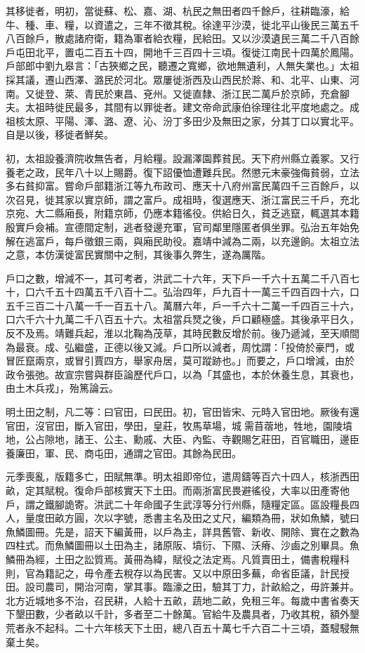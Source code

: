 其移徙者，明初，當徙蘇、松、嘉、湖、杭民之無田者四千餘戶，往耕臨濠，給牛、種、車、糧，以資遣之，三年不徵其稅。徐達平沙漠，徙北平山後民三萬五千八百餘戶，散處諸府衛，籍為軍者給衣糧，民給田。又以沙漠遺民三萬二千八百餘戶屯田北平，置屯二百五十四，開地千三百四十三頃。復徙江南民十四萬於鳳陽。戶部郎中劉九皋言：「古狹鄉之民，聽遷之寬鄉，欲地無遺利，人無失業也。」太祖採其議，遷山西澤、潞民於河北。眾屢徙浙西及山西民於滁、和、北平、山東、河南。又徙登、萊、青民於東昌、兗州。又徙直隸、浙江民二萬戶於京師，充倉腳夫。太祖時徙民最多，其間有以罪徙者。建文帝命武康伯徐理往北平度地處之。成祖核太原、平陽、澤、潞、遼、沁、汾丁多田少及無田之家，分其丁口以實北平。自是以後，移徙者鮮矣。

初，太祖設養濟院收無告者，月給糧。設漏澤園葬貧民。天下府州縣立義冢。又行養老之政，民年八十以上賜爵。復下詔優恤遭難兵民。然懲元末豪強侮貧弱，立法多右貧抑富。嘗命戶部籍浙江等九布政司、應天十八府州富民萬四千三百餘戶，以次召見，徙其家以實京師，謂之富戶。成祖時，復選應天、浙江富民三千戶，充北京宛、大二縣廂長，附籍京師，仍應本籍徭役。供給日久，貧乏逃竄，輒選其本籍殷實戶僉補。宣德間定制，逃者發邊充軍，官司鄰里隱匿者俱坐罪。弘治五年始免解在逃富戶，每戶徵銀三兩，與廂民助役。嘉靖中減為二兩，以充邊餉。太祖立法之意，本仿漢徙富民實關中之制，其後事久弊生，遂為厲階。

戶口之數，增減不一，其可考者，洪武二十六年，天下戶一千六十五萬二千八百七十，口六千五十四萬五千八百十二。弘治四年，戶九百十一萬三千四百四十六，口五千三百二十八萬一千一百五十八。萬曆六年，戶一千六十二萬一千四百三十六，口六千六十九萬二千八百五十六。太祖當兵燹之後，戶口顧極盛。其後承平日久，反不及焉。靖難兵起，淮以北鞠為茂草，其時民數反增於前。後乃遞減，至天順間為最衰。成、弘繼盛，正德以後又減。戶口所以減者，周忱謂：「投倚於豪門，或冒匠竄兩京，或冒引賈四方，舉家舟居，莫可蹤跡也。」而要之，戶口增減，由於政令張弛。故宣宗嘗與群臣論歷代戶口，以為「其盛也，本於休養生息，其衰也，由土木兵戎」，殆篤論云。

明土田之制，凡二等：曰官田，曰民田。初，官田皆宋、元時入官田地。厥後有還官田，沒官田，斷入官田，學田，皇莊，牧馬草場，城需苜蓿地，牲地，園陵墳地，公占隙地，諸王、公主、勳戚、大臣、內監、寺觀賜乞莊田，百官職田，邊臣養廉田，軍、民、商屯田，通謂之官田。其餘為民田。

元季喪亂，版籍多亡，田賦無準。明太祖即帝位，遣周鑄等百六十四人，核浙西田畝，定其賦稅。復命戶部核實天下土田。而兩浙富民畏避徭役，大率以田產寄他戶，謂之鐵腳詭寄。洪武二十年命國子生武淳等分行州縣，隨糧定區。區設糧長四人，量度田畝方圓，次以字號，悉書主名及田之丈尺，編類為冊，狀如魚鱗，號曰魚鱗圖冊。先是，詔天下編黃冊，以戶為主，詳具舊管、新收、開除、實在之數為四柱式。而魚鱗圖冊以土田為主，諸原阪、墳衍、下隰、沃瘠、沙鹵之別畢具。魚鱗冊為經，土田之訟質焉。黃冊為緯，賦役之法定焉。凡質賣田土，備書稅糧科則，官為籍記之，毋令產去稅存以為民害。又以中原田多蕪，命省臣議，計民授田。設司農司，開治河南，掌其事。臨濠之田，驗其丁力，計畝給之，毋許兼并。北方近城地多不治，召民耕，人給十五畝，蔬地二畝，免租三年。每歲中書省奏天下墾田數，少者畝以千計，多者至二十餘萬。官給牛及農具者，乃收其稅，額外墾荒者永不起科。二十六年核天下土田，總八百五十萬七千六百二十三頃，蓋駸駸無棄土矣。

